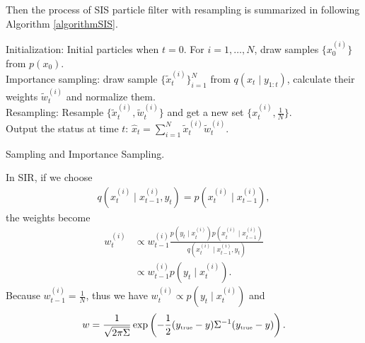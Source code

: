 Then the process of SIS particle filter with resampling is summarized in following Algorithm \ref{algorithmSIS}. 
\begin{algorithm}[h]
\SetAlgoLined 
Initialization: Initial particles when $t=0$. For $i=1, \ldots, N$, draw samples $\{x_0^{(i)}\}$ from $p(x_0)$.\\
 {Importance sampling: draw sample $\{\tilde{x}_t^{(i)}\}_{i=1}^N$ from $q(x_t \mid y_{1:t})$, calculate their weights $\tilde{w}_t^{(i)}$ and normalize them. \\
Resampling: Resample $\{\tilde{x}_t^{(i)}, \tilde{w}_t^{(i)}\}$ and get a new set $\{x_t^{(i)},\frac{1}{N}\}$.\\
Output the status at time $t$: $\hat{x}_t =\sum_{i=1}^{N}\tilde{x}_t^{(i)}\tilde{w}_t^{(i)}$.}
 \caption{Sampling and Importance Sampling.}\label{algorithmSIS}
\end{algorithm}


In SIR, if we choose
\begin{align*}
q(x_t^{(i)}\mid x_{t-1}^{(i)},y_t ) = p(x_t^{(i)}\mid x_{t-1}^{(i)}),
\end{align*}
the weights become
\begin{align*}
w_t^{(i)}&\propto w_{t-1}^{(i)}\frac{ p(y_t \mid x_{t}^{(i)}) p(x_t^{(i)}\mid x_{t-1}^{(i)}) }{q(x_t^{(i)}\mid x_{t-1}^{(i)},y_t ) }\\
&\propto w_{t-1}^{(i)}p(y_t \mid x_{t}^{(i)}).
\end{align*}
Because $w_{t-1}^{(i)}=\frac{1}{N}$, thus we have $w_t^{(i)} \propto p(y_t \mid x_{t}^{(i)})$ and
\begin{align*}
w=\frac{1}{\sqrt{2\pi\Sigma}}\exp\left(-\frac{1}{2} (y_{\mbox{\tiny true}}-y)\Sigma^{-1}(y_{\mbox{\tiny true}}-y)\right).
\end{align*}

